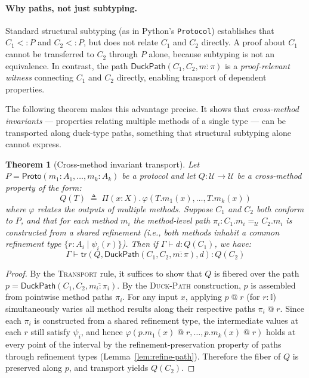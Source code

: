 \documentclass[acmsmall,nonacm,screen]{acmart}
\newtheorem{theorem}{Theorem}[section]
\newcommand{\syntype}[1]{\ensuremath{\mathsf{#1}}}
\newcommand{\pyproto}[1]{\syntype{Proto}(#1)}
\newcommand{\pitype}[3]{\Pi(#1 : #2).\,#3}
\newcommand{\pathtype}[3]{#2 =_{#1} #3}
\newcommand{\reftype}[3]{\{#1 : #2 \mid #3\}}
\newcommand{\interval}{\mathbb{I}}
\newcommand{\universe}{\mathcal{U}}
\newcommand{\ctx}{\Gamma}
\newcommand{\jdg}[3]{#1 \vdash #2 : #3}
\newcommand{\transport}[3]{\syntype{tr}(#1, #2, #3)}
\newcommand{\duckpath}{\ensuremath{\syntype{DuckPath}}}
\begin{document}
\paragraph{Why paths, not just subtyping.}
Standard structural subtyping (as in Python's \texttt{Protocol})
establishes that $C_1 <: P$ and $C_2 <: P$, but does not relate
$C_1$ and $C_2$ directly.  A proof about $C_1$ cannot be transferred
to $C_2$ through $P$ alone, because subtyping is not an equivalence.
In contrast, the path $\duckpath(C_1,C_2,\overline{m:\pi})$
is a \emph{proof-relevant witness} connecting $C_1$ and $C_2$
directly, enabling transport of dependent properties.

The following theorem makes this advantage precise.  It shows that
\emph{cross-method invariants} --- properties relating multiple methods
of a single type --- can be transported along duck-type paths, something
that structural subtyping alone cannot express.

\begin{theorem}[Cross-method invariant transport]\label{thm:cross}
Let $P = \pyproto{m_1 : A_1, \ldots, m_k : A_k}$ be a protocol and
let $Q : \universe \to \universe$ be a \emph{cross-method property}
of the form:
\[
  Q(T) \;\triangleq\; \pitype{x}{X}{\varphi(T.m_1(x), \ldots, T.m_k(x))}
\]
where $\varphi$ relates the outputs of multiple methods.  Suppose
$C_1$ and $C_2$ both conform to $P$, and that for each method $m_i$
the method-level path
$\pi_i : \pathtype{\universe}{C_1.m_i}{C_2.m_i}$ is constructed
from a shared refinement (i.e., both methods inhabit a common
refinement type $\reftype{r}{A_i}{\psi_i(r)}$).  Then if
$\jdg{\ctx}{d}{Q(C_1)}$, we have:
\[
  \jdg{\ctx}{\transport{Q}{\duckpath(C_1,C_2,\overline{m:\pi})}{d}}{Q(C_2)}
\]
\end{theorem}

\begin{proof}
By the \textsc{Transport} rule, it suffices to show that
$Q$ is fibered over the path
$p = \duckpath(C_1, C_2, \overline{m_i : \pi_i})$.
By the \textsc{Duck-Path} construction, $p$ is assembled from
pointwise method paths $\pi_i$.  For any input $x$, applying
$p\;@\;r$ (for $r : \interval$) simultaneously varies all method
results along their respective paths $\pi_i\;@\;r$.  Since each
$\pi_i$ is constructed from a shared refinement type, the
intermediate values at each $r$ still satisfy $\psi_i$, and hence
$\varphi(p.m_1(x)\;@\;r, \ldots, p.m_k(x)\;@\;r)$ holds at every
point of the interval by the refinement-preservation property of
paths through refinement types (Lemma~\ref{lem:refine-path}).
Therefore the fiber of $Q$ is preserved along $p$, and transport
yields $Q(C_2)$.
\end{proof}
\end{document}
